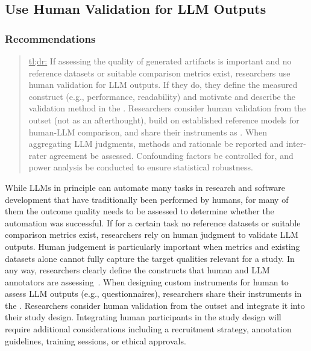 



\subsection{Use Human Validation for LLM Outputs}

\subsubsection{Recommendations}

\begin{quote}
\underline{tl;dr:} If assessing the quality of generated artifacts is important and no reference datasets or suitable comparison metrics exist, researchers \should use human validation for LLM outputs. If they do, they \must define the measured construct (e.g., performance, readability) and motivate and describe the validation method in the \paper. Researchers \should consider human validation from the outset (not as an afterthought), build on established reference models for human-LLM comparison, and share their instruments as \supplementarymaterial. When aggregating LLM judgments, methods and rationale \should be reported and inter-rater agreement \should be assessed. Confounding factors \should be controlled for, and power analysis \should be conducted to ensure statistical robustness.
\end{quote}

While LLMs in principle can automate many tasks in research and software development that have traditionally been performed by humans, for many of them the outcome quality needs to be assessed to determine whether the automation was successful.
If for a certain task no reference datasets or suitable comparison metrics exist, researchers \should rely on human judgment to validate LLM outputs.
Human judgement is particularly important when metrics and existing datasets alone cannot fully capture the target qualities relevant for a study.
In any way, researchers \must clearly define the constructs that human and LLM annotators are assessing~\cite{DBLP:conf/ease/RalphT18}.
When designing custom instruments for human to assess LLM outputs (e.g., questionnaires), researchers \should share their instruments in the \supplementarymaterial.
Researchers \should consider human validation from the outset and integrate it into their study design.
Integrating human participants in the study design will require additional considerations including a recruitment strategy, annotation guidelines, training sessions, or ethical approvals.

